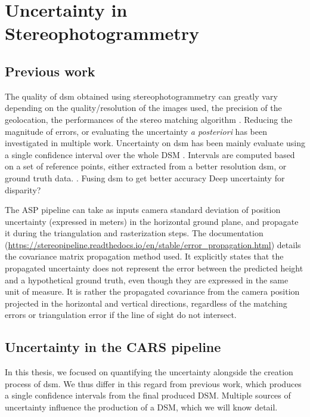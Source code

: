 \section{Uncertainty in Stereophotogrammetry}\label{sec:previous_work_stereo_uncertainty}
\subsection{Previous work}
The quality of \acrshort{dsm} obtained using stereophotogrammetry can greatly vary depending on the quality/resolution of the images used, the precision of the geolocation, the performances of the stereo matching algorithm \etc. Reducing the magnitude of errors, or evaluating the uncertainty \textit{a posteriori} has been investigated in multiple work.
Uncertainty on \acrshort{dsm} has been mainly evaluate using a single confidence interval over the whole DSM \cite{hugonnet_uncertainty_2022, deschamps-berger_apport_2021, wang_robust_2015, oksanen_digital_2006,panagiotakis_validation_2018}. Intervals are computed based on a set of reference points, either extracted from a better resolution \acrshort{dsm}, or ground truth data. . Fusing \acrshort{dsm} to get better accuracy \cite{qin_uncertainty-guided_2022}
\cite{hu_quantitative_2012,poggi_confidence_2021}
Deep uncertainty for disparity?

The ASP pipeline can take as inputs camera standard deviation of position uncertainty (expressed in meters) in the horizontal ground plane, and propagate it during the triangulation and rasterization steps. The documentation (\url{https://stereopipeline.readthedocs.io/en/stable/error_propagation.html}) details the covariance matrix propagation method used. It explicitly states that the propagated uncertainty does not represent the error between the predicted height and a hypothetical ground truth, even though they are expressed in the same unit of measure. It is rather the propagated covariance from the camera position projected in the horizontal and vertical directions, regardless of the matching errors or triangulation error if the line of sight do not intersect.

\subsection{Uncertainty in the CARS pipeline}\label{sec:uncertainty_cars}
In this thesis, we focused on quantifying the uncertainty alongside the creation process of \acrshort{dsm}. We thus differ in this regard from previous work, which produces a single confidence intervals from the final produced DSM. Multiple sources of uncertainty influence the production of a DSM, which we will know detail.

